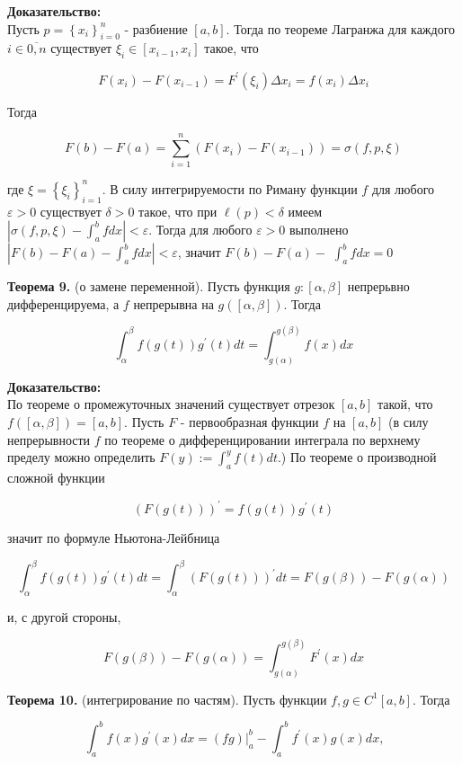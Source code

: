 \documentclass[a4paper,12pt]{article} %
\begin{document}
	\textbf{Доказательство:\\}
	Пусть $p=\left\{x_{i}\right\}_{i=0}^{n}$ - разбиение $[a, b]$. Тогда по теореме Лагранжа для каждого $i \in \overline{0, n}$ существует $\xi_{i} \in\left[x_{i-1}, x_{i}\right]$ такое, что
	
	$$
	F\left(x_{i}\right)-F\left(x_{i-1}\right)=F^{\prime}\left(\xi_{i}\right) \Delta x_{i}=f\left(x_{i}\right) \Delta x_{i}
	$$
	
	Тогда
	
	$$
	F(b)-F(a)=\sum_{i=1}^{n}\left(F\left(x_{i}\right)-F\left(x_{i-1}\right)\right)=\sigma(f, p, \xi)
	$$
	
	где $\xi=\left\{\xi_{i}\right\}_{i=1}^{n}$. В силу интегрируемости по Риману функции $f$ для любого $\varepsilon>0$ существует $\delta>0$ такое, что при $\ell(p)<\delta$ имеем $\left|\sigma(f, p, \xi)-\int_{a}^{b} f d x\right|<\varepsilon$. Тогда для любого $\varepsilon>0$ выполнено $\left|F(b)-F(a)-\int_{a}^{b} f d x\right|<\varepsilon$, значит $F(b)-F(a)-$ $\int_{a}^{b} f d x=0$
	
	\textbf{Теорема 9.} (о замене переменной). Пусть функция $g:[\alpha, \beta]$ непрерьвно дифференцируема, а $f$ непрерывна на $g([\alpha, \beta])$. Тогда
	
	$$
	\int_{\alpha}^{\beta} f(g(t)) g^{\prime}(t) d t=\int_{g(\alpha)}^{g(\beta)} f(x) d x
	$$
	
	\textbf{Доказательство:\\}
	По теореме о промежуточных значений существует отрезок $[a, b]$ такой, что $f([\alpha, \beta])=[a, b]$. Пусть $F$ - первообразная функции $f$ на $[a, b]$ (в силу непрерывности $f$ по теореме о дифференцировании интеграла по верхнему пределу можно определить $F(y):=\int_{a}^{y} f(t) d t$.) По теореме о производной сложной функции
	
	$$
	(F(g(t)))^{\prime}=f(g(t)) g^{\prime}(t)
	$$
	
	значит по формуле Ньютона-Лейбница
	
	$$
	\int_{\alpha}^{\beta} f(g(t)) g^{\prime}(t) d t=\int_{\alpha}^{\beta}(F(g(t)))^{\prime} d t=F(g(\beta))-F(g(\alpha))
	$$
	
	и, с другой стороны,
	
	$$
	F(g(\beta))-F(g(\alpha))=\int_{g(\alpha)}^{g(\beta)} F^{\prime}(x) d x
	$$
	
	\textbf{Теорема 10.} (интегрирование по частям). Пусть функции $f, g \in C^{1}[a, b]$. Тогда
	
	$$
	\int_{a}^{b} f(x) g^{\prime}(x) d x=\left.(f g)\right|_{a} ^{b}-\int_{a}^{b} f^{\prime}(x) g(x) d x \text{,}
	$$
	
\end{document}
